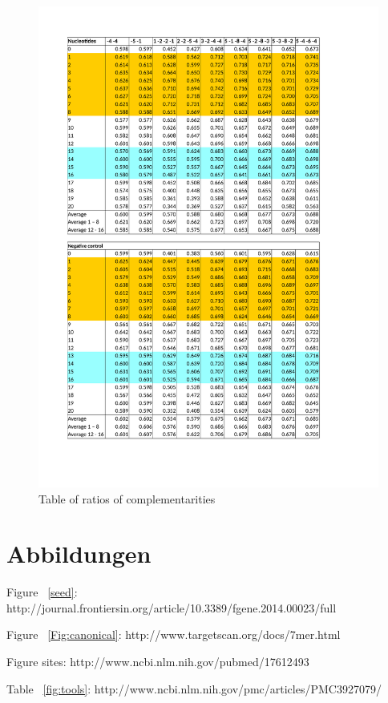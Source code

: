 \documentclass[12pt]{article}
\begin{document}
\begin{figure}
\label{table:ratios}
\vspace{-3cm}
\includegraphics[scale=0.8]{results/ratio_table.pdf}
\vspace{-2.8cm}
\caption{Table of ratios of complementarities}
\end{figure}





\section{Abbildungen}
Figure ~\ref{seed}: http://journal.frontiersin.org/article/10.3389/fgene.2014.00023/full

Figure ~\ref{Fig:canonical}: http://www.targetscan.org/docs/7mer.html

Figure sites: http://www.ncbi.nlm.nih.gov/pubmed/17612493

Table ~\ref{fig:tools}: http://www.ncbi.nlm.nih.gov/pmc/articles/PMC3927079/
\end{document}
